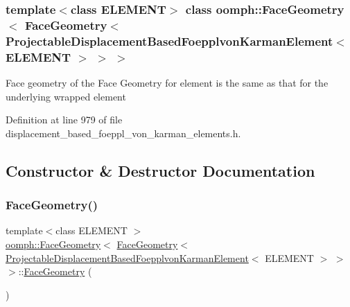 \subsubsection*{template$<$class E\+L\+E\+M\+E\+NT$>$\newline
class oomph\+::\+Face\+Geometry$<$ Face\+Geometry$<$ Projectable\+Displacement\+Based\+Foepplvon\+Karman\+Element$<$ E\+L\+E\+M\+E\+N\+T $>$ $>$ $>$}

Face geometry of the Face Geometry for element is the same as that for the underlying wrapped element 

Definition at line 979 of file displacement\+\_\+based\+\_\+foeppl\+\_\+von\+\_\+karman\+\_\+elements.\+h.



\subsection{Constructor \& Destructor Documentation}
\mbox{\label{classoomph_1_1FaceGeometry_3_01FaceGeometry_3_01ProjectableDisplacementBasedFoepplvonKarmanElement_3_01ELEMENT_01_4_01_4_01_4_a909f3e87e9875f241b3b5586231d2a76}} 
\subsubsection{\texorpdfstring{Face\+Geometry()}{FaceGeometry()}}
{\footnotesize\ttfamily template$<$class E\+L\+E\+M\+E\+NT $>$ \\
\hyperlink{classoomph_1_1FaceGeometry}{oomph\+::\+Face\+Geometry}$<$ \hyperlink{classoomph_1_1FaceGeometry}{Face\+Geometry}$<$ \hyperlink{classoomph_1_1ProjectableDisplacementBasedFoepplvonKarmanElement}{Projectable\+Displacement\+Based\+Foepplvon\+Karman\+Element}$<$ E\+L\+E\+M\+E\+NT $>$ $>$ $>$\+::\hyperlink{classoomph_1_1FaceGeometry}{Face\+Geometry} (\begin{DoxyParamCaption}{ }\end{DoxyParamCaption})\hspace{0.3cm}{\ttfamily [inline]}}



